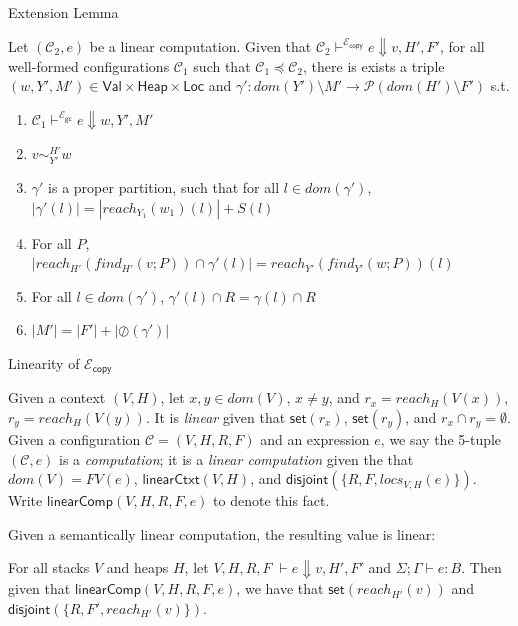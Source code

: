 \documentclass{beamer}
\newcommand{\ms}[1]{\ensuremath{\mathsf{#1}}}
\newcommand{\na}[1]{\mathsf{linearCtxt}(#1)}
\newcommand{\dist}[1]{\mathsf{disjoint}(#1)}
\newcommand{\wfc}[5]{\mathsf{linearComp}(#1,#2,#3,#4,#5)}
\newcommand{\veq}[4]{#3 \sim^{#1}_{#2} #4}
\newcommand{\oh}[1]{\oslash(#1)}
\newcommand{\gcSem}{\ensuremath{\mathcal{E}_{\ms{gc}}}}
\newcommand{\copySem}{\ensuremath{\mathcal{E}_{\ms{copy}}}}
\theoremstyle{definition}
\begin{document}
\begin{frame}{Extension Lemma}
  \begin{lemma}\label{itm:frugal}
	Let $(\mathcal{C}_2,e)$ be a linear computation. Given that 
	$\mathcal{C}_2 \vdash^{\copySem} e \Downarrow v,H',F'$,
	for all well-formed configurations $\mathcal{C}_1$ such that $\mathcal{C}_1 \preceq \mathcal{C}_2$,
there is exists a triple
$(w,Y',M') \in \ms{Val} \times \ms{Heap} \times \ms{Loc}$ and 
	$\gamma' : dom(Y') \setminus M' \to \mathcal{P}(dom(H') \setminus F')$ s.t.
	\begin{enumerate}
			\item $\mathcal{C}_1 \vdash^{\gcSem} e \Downarrow w,Y',M'$
			\item $\veq{H'}{Y'}{v}{w}$
			\item $\gamma'$ is a proper partition, such that for all $l \in dom(\gamma')$, 
				$|\gamma'(l)| = |reach_{Y_1}(w_1)(l)| + S(l)$
			\item For all $P$, $|reach_{H'}(find_{H'}(v;P)) \cap \gamma'(l)| = 
				reach_{Y'}(find_{Y'}(w;P))(l)$
			\item For all $l \in dom(\gamma')$, $\gamma'(l) \cap R = \gamma(l) \cap R$
			\item $|M'| = |F'| + |\oh{\gamma'}|$
	\end{enumerate}
\end{lemma}
\end{frame}



\begin{frame}{Linearity of \copySem}
\begin{definition}
  Given a context $(V,H)$, let
$x,y \in dom(V)$, $x \ne y$, and $r_x = reach_H(V(x))$, $r_y = reach_H(V(y))$.
It is \emph{linear} given that  $\ms{set}(r_x)$, $\ms{set}(r_y)$, and $r_x \cap r_y = \emptyset$.
Given a configuration $\mathcal{C} = (V,H,R,F)$ and an expression $e$, 
we say the 5-tuple $(\mathcal{C},e)$ is a \emph{computation}; it is a \emph{linear computation} 
given the that  $dom(V) = FV(e)$, $\na{V,H}$, and $\dist{\{R,F,locs_{V,H}(e)\}}$.
Write $\wfc{V}{H}{R}{F}{e}$ to denote this fact.
\end{definition}

Given a semantically linear computation, the resulting value is linear: 
\begin{lemma}[Linearity of \copySem]\label{itm:na}
For all stacks $V$ and heaps $H$, let  $V,H,R,F \; \vdash e \Downarrow v, H', F'$ 
and $\Sigma; \Gamma \vdash e : B$. Then given that $\wfc{V}{H}{R}{F}{e}$, we have that $\ms{set}(reach_{H'}(v))$ and $\dist{\{R,F',reach_{H'}(v)\}}$.
\end{lemma}
\end{frame}
\end{document}
